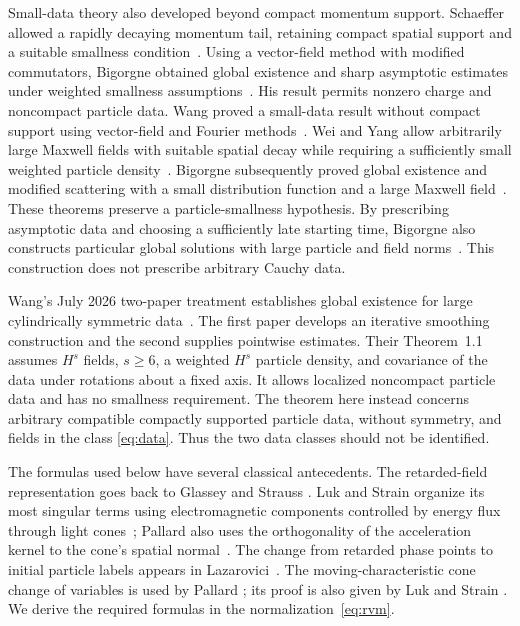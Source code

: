 Small-data theory also developed beyond compact momentum support.
Schaeffer allowed a rapidly decaying momentum tail, retaining compact
spatial support and a suitable smallness
condition~\cite{Schaeffer2004}.
Using a vector-field method with modified commutators, Bigorgne obtained
global existence and sharp asymptotic estimates under weighted smallness
assumptions~\cite{Bigorgne2020}.
His result permits nonzero charge and noncompact particle data.
Wang proved a small-data result without compact support using vector-field
and Fourier methods~\cite{Wang2022SmallData}.
Wei and Yang allow arbitrarily large Maxwell fields with suitable
spatial decay while requiring a sufficiently small weighted particle
density~\cite{WeiYang2021}. Bigorgne subsequently proved global
existence and modified scattering with a small distribution function
and a large Maxwell field~\cite{Bigorgne2025SmallDistribution}.
These theorems preserve a particle-smallness hypothesis.
By prescribing asymptotic data and choosing a sufficiently late starting
time, Bigorgne also constructs particular global solutions with large
particle and field norms~\cite{Bigorgne2023ScatteringMap}. This
construction does not prescribe arbitrary Cauchy data.

Wang's July 2026 two-paper treatment establishes global existence for
large cylindrically symmetric data~\cite{Wang2026I,Wang2026II}.
The first paper develops an iterative smoothing construction and the
second supplies pointwise estimates. Their Theorem~1.1 assumes
$H^s$ fields, $s\ge6$, a weighted $H^s$ particle density, and covariance
of the data under rotations about a fixed axis. It allows localized
noncompact particle data and has no smallness requirement.
The theorem here instead concerns arbitrary compatible compactly
supported particle data, without symmetry, and fields in the class
\eqref{eq:data}. Thus the two data classes should not be identified.

The formulas used below have several classical antecedents.
The retarded-field representation goes back to Glassey and Strauss
\cite{GlasseyStrauss1986}. Luk and Strain organize its most singular
terms using electromagnetic components controlled by energy flux
through light cones~\cite[Proposition~2.2 and Section~3]{LukStrain2014Continuation};
Pallard also uses the orthogonality of the acceleration kernel to the
cone's spatial normal~\cite[Lemma~2.1 and Section~2.3]{Pallard2015Refined}.
The change from retarded phase points to initial particle labels appears
in Lazarovici~\cite[Lemma~9.2]{Lazarovici2016}.
The moving-characteristic cone change of variables is used by Pallard
\cite{Pallard2005}; its proof is also given by Luk and Strain
\cite[Proposition~5.2]{LukStrain2014Continuation}.
We derive the required formulas in the normalization~\eqref{eq:rvm}.

